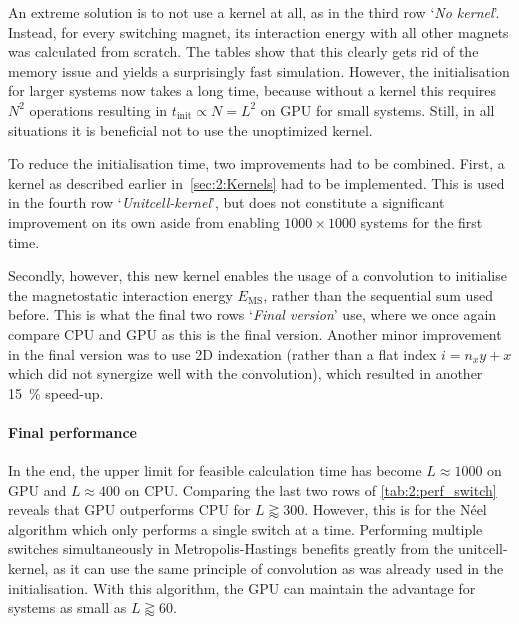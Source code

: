 An extreme solution is to not use a kernel at all, as in the third row `\textit{No kernel}'.
Instead, for every switching magnet, its interaction energy with all other magnets was calculated from scratch.
The tables show that this clearly gets rid of the memory issue and yields a surprisingly fast simulation.
However, the initialisation for larger systems now takes a long time, because without a kernel this requires $N^2$ operations resulting in $t_\mathrm{init} \propto N=L^2$ on GPU for small systems.
Still, in all situations it is beneficial not to use the unoptimized kernel. \\\par

To reduce the initialisation time, two improvements had to be combined.
First, a kernel as described earlier in~\cref{sec:2:Kernels} had to be implemented.
This is used in the fourth row `\textit{Unitcell-kernel}', but does not constitute a significant improvement on its own aside from enabling $1000 \times 1000$ systems for the first time. \par
Secondly, however, this new kernel enables the usage of a convolution to initialise the magnetostatic interaction energy $E_\mathrm{MS}$, rather than the sequential sum used before.
This is what the final two rows `\textit{Final version}' use, where we once again compare CPU and GPU as this is the final version.
Another minor improvement in the final version was to use 2D indexation (rather than a flat index $i = n_x y + x$ which did not synergize well with the convolution), which resulted in another \SI{15}{\percent} speed-up.

\paragraph{Final performance}
In the end, the upper limit for feasible calculation time has become $L \approx 1000$ on GPU and $L \approx 400$ on CPU.
Comparing the last two rows of \cref{tab:2:perf_switch} reveals that GPU outperforms CPU for $L \gtrapprox 300$.
However, this is for the N\'eel algorithm which only performs a single switch at a time.
Performing multiple switches simultaneously in Metropolis-Hastings benefits greatly from the unitcell-kernel, as it can use the same principle of convolution as was already used in the initialisation.
With this algorithm, the GPU can maintain the advantage for systems as small as $L \gtrapprox 60$.

